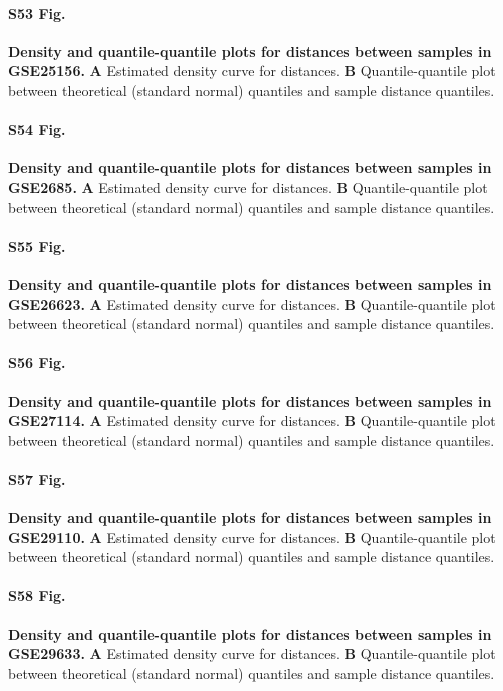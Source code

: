 \documentclass[10pt,letterpaper]{article}
\begin{document}
\paragraph*{S53 Fig.}
\hypertarget{S53_Fig}{
{\bf Density and quantile-quantile plots for distances between samples in GSE25156.} \textbf{A} Estimated density curve for distances. \textbf{B} Quantile-quantile plot between theoretical (standard normal) quantiles and sample distance quantiles.}

\paragraph*{S54 Fig.}
\hypertarget{S54_Fig}{
{\bf Density and quantile-quantile plots for distances between samples in GSE2685.} \textbf{A} Estimated density curve for distances. \textbf{B} Quantile-quantile plot between theoretical (standard normal) quantiles and sample distance quantiles.}

\paragraph*{S55 Fig.}
\hypertarget{S55_Fig}{
{\bf Density and quantile-quantile plots for distances between samples in GSE26623.} \textbf{A} Estimated density curve for distances. \textbf{B} Quantile-quantile plot between theoretical (standard normal) quantiles and sample distance quantiles.}

\paragraph*{S56 Fig.}
\hypertarget{S56_Fig}{
{\bf Density and quantile-quantile plots for distances between samples in GSE27114.} \textbf{A} Estimated density curve for distances. \textbf{B} Quantile-quantile plot between theoretical (standard normal) quantiles and sample distance quantiles.}

\paragraph*{S57 Fig.}
\hypertarget{S57_Fig}{
{\bf Density and quantile-quantile plots for distances between samples in GSE29110.} \textbf{A} Estimated density curve for distances. \textbf{B} Quantile-quantile plot between theoretical (standard normal) quantiles and sample distance quantiles.}

\paragraph*{S58 Fig.}
\hypertarget{S58_Fig}{
{\bf Density and quantile-quantile plots for distances between samples in GSE29633.} \textbf{A} Estimated density curve for distances. \textbf{B} Quantile-quantile plot between theoretical (standard normal) quantiles and sample distance quantiles.}
\end{document}
